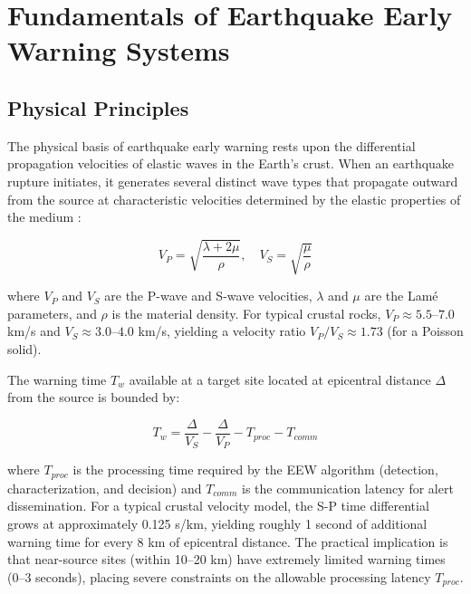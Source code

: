 \documentclass[review,authoryear]{elsarticle}
\begin{document}
\section{Fundamentals of Earthquake Early Warning Systems}
\label{sec:fundamentals}

\subsection{Physical Principles}

The physical basis of earthquake early warning rests upon the differential propagation velocities of elastic waves in the Earth's crust. When an earthquake rupture initiates, it generates several distinct wave types that propagate outward from the source at characteristic velocities determined by the elastic properties of the medium \citep{aki1980quantitative, lay1995modern}:

\begin{equation}
V_P = \sqrt{\frac{\lambda + 2\mu}{\rho}}, \quad V_S = \sqrt{\frac{\mu}{\rho}}
\label{eq:wave_velocities}
\end{equation}

\noindent where $V_P$ and $V_S$ are the P-wave and S-wave velocities, $\lambda$ and $\mu$ are the Lam\'{e} parameters, and $\rho$ is the material density. For typical crustal rocks, $V_P \approx 5.5$--$7.0$ km/s and $V_S \approx 3.0$--$4.0$ km/s, yielding a velocity ratio $V_P/V_S \approx 1.73$ (for a Poisson solid).

The warning time $T_w$ available at a target site located at epicentral distance $\Delta$ from the source is bounded by:

\begin{equation}
T_w = \frac{\Delta}{V_S} - \frac{\Delta}{V_P} - T_{proc} - T_{comm}
\label{eq:warning_time}
\end{equation}

\noindent where $T_{proc}$ is the processing time required by the EEW algorithm (detection, characterization, and decision) and $T_{comm}$ is the communication latency for alert dissemination. For a typical crustal velocity model, the S-P time differential grows at approximately 0.125 s/km, yielding roughly 1 second of additional warning time for every 8 km of epicentral distance. The practical implication is that near-source sites (within 10--20 km) have extremely limited warning times (0--3 seconds), placing severe constraints on the allowable processing latency $T_{proc}$.
\end{document}
